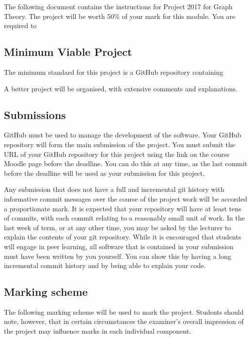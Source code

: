 \documentclass[12pt, a4paper]{article}
\title{\projectname}
\author{\modulename}
\date{Due: \duedate}
\newcommand{\modulename}{Graph Theory}
\newcommand{\projectyear}{2017}
\newcommand{\projectname}{Project \projectyear}
\begin{document}
\maketitle

\noindent
The following document contains the instructions for \projectname{} for \modulename{}.
The project will be worth 50\% of your mark for this module.
You are required to 

\subsection*{Minimum Viable Project}
The minimum standard for this project is a GitHub repository containing

A better project will be organised, with extensive comments and explanations.


\subsection*{Submissions}
GitHub must be used to manage the development of the software.
Your GitHub repository will form the main submission of the project.
You must submit the URL of your GitHub repository for this project using the link on the course Moodle page before the deadline.
You can do this at any time, as the last commit before the deadline will be used as your submission for this project.

Any submission that does not have a full and incremental git history with informative commit messages over the course of the project work will be accorded a proportionate mark.
It is expected that your repository will have at least tens of commits, with each commit relating to a reasonably small unit of work.
In the last week of term, or at any other time, you may be asked by the lecturer to explain the contents of your git repository.
While it is encouraged that students will engage in peer learning, all software that is contained in your submission must have been written by you yourself.
You can show this by having a long incremental commit history and by being able to explain your code.

\subsection*{Marking scheme}
The following marking scheme will be used to mark the project.
Students should note, however, that in certain circumstances the examiner's overall impression of the project may influence marks in each individual component.
\end{document}
